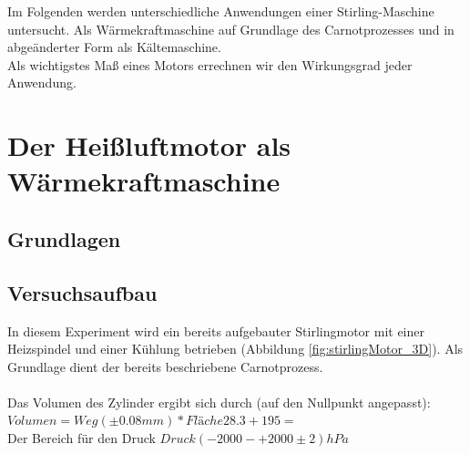\documentclass[12pt,a4paper]{article}
\begin{document}
\begin{multicols}{2}




%			


\noindent Im Folgenden werden unterschiedliche Anwendungen einer Stirling-Maschine untersucht. Als Wärmekraftmaschine auf Grundlage des Carnotprozesses und in abgeänderter Form als Kältemaschine.\\
Als wichtigstes Maß eines Motors errechnen wir den Wirkungsgrad jeder Anwendung.


\section{Der Heißluftmotor als Wärmekraftmaschine}

\subsection{Grundlagen}

\subsection{Versuchsaufbau}
In diesem Experiment wird ein bereits aufgebauter Stirlingmotor mit einer Heizspindel und einer Kühlung betrieben (Abbildung  \ref{fig:stirlingMotor_3D}). Als Grundlage dient der bereits beschriebene Carnotprozess.\\
\\
Das Volumen des Zylinder ergibt sich durch (auf den Nullpunkt angepasst):\\
$Volumen = Weg (\pm 0.08mm) * Fläche 28.3 + 195 = $\\ %
Der Bereich für den Druck
$Druck (-2000 - +2000 \pm 2) hPa$\\


\end{multicols}
\end{document}
